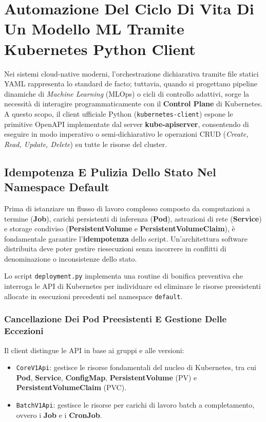 \documentclass[11pt, a4paper]{article}
\begin{document}
\section{Automazione Del Ciclo Di Vita Di Un Modello ML Tramite Kubernetes Python Client}

Nei sistemi cloud-native moderni, l'orchestrazione dichiarativa tramite file statici YAML rappresenta lo standard de facto; tuttavia, quando si progettano pipeline dinamiche di \emph{Machine Learning} (MLOps) o cicli di controllo adattivi, sorge la necessità di interagire programmaticamente con il \textbf{Control Plane} di Kubernetes.
A questo scopo, il client ufficiale Python (\texttt{kubernetes-client}) espone le primitive OpenAPI implementate dal server \textbf{kube-apiserver}, consentendo di eseguire in modo imperativo o semi-dichiarativo le operazioni CRUD (\emph{Create, Read, Update, Delete}) su tutte le risorse del cluster.

\subsection{Idempotenza E Pulizia Dello Stato Nel Namespace Default}

Prima di istanziare un flusso di lavoro complesso composto da computazioni a termine (\textbf{Job}), carichi persistenti di inferenza (\textbf{Pod}), astrazioni di rete (\textbf{Service}) e storage condiviso (\textbf{PersistentVolume} e \textbf{PersistentVolumeClaim}), è fondamentale garantire l'\textbf{idempotenza} dello script. Un'architettura software distribuita deve poter gestire riesecuzioni senza incorrere in conflitti di denominazione o inconsistenze dello stato.

Lo script \texttt{deployment.py} implementa una routine di bonifica preventiva che interroga le API di Kubernetes per individuare ed eliminare le risorse preesistenti allocate in esecuzioni precedenti nel namespace \texttt{default}.

\subsubsection{Cancellazione Dei Pod Preesistenti E Gestione Delle Eccezioni}

Il client distingue le API in base ai gruppi e alle versioni:
\begin{itemize}[noitemsep]
    \item \texttt{CoreV1Api}: gestisce le risorse fondamentali del nucleo di Kubernetes, tra cui \textbf{Pod}, \textbf{Service}, \textbf{ConfigMap}, \textbf{PersistentVolume} (PV) e \textbf{PersistentVolumeClaim} (PVC).
    \item \texttt{BatchV1Api}: gestisce le risorse per carichi di lavoro batch a completamento, ovvero i \textbf{Job} e i \textbf{CronJob}.
\end{itemize}
\end{document}
